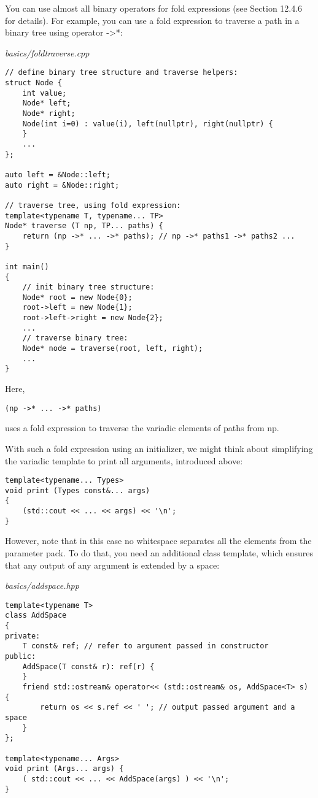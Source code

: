 You can use almost all binary operators for fold expressions (see Section 12.4.6 for details). For example, you can use a fold expression to traverse a path in a binary tree using operator ->*:

\noindent
\textit{basics/foldtraverse.cpp}
\begin{lstlisting}[style=styleCXX]
// define binary tree structure and traverse helpers:
struct Node {
	int value;
	Node* left;
	Node* right;
	Node(int i=0) : value(i), left(nullptr), right(nullptr) {
	}
	...
};

auto left = &Node::left;
auto right = &Node::right;

// traverse tree, using fold expression:
template<typename T, typename... TP>
Node* traverse (T np, TP... paths) {
	return (np ->* ... ->* paths); // np ->* paths1 ->* paths2 ...
}

int main()
{
	// init binary tree structure:
	Node* root = new Node{0};
	root->left = new Node{1};
	root->left->right = new Node{2};
	...
	// traverse binary tree:
	Node* node = traverse(root, left, right);
	...
}
\end{lstlisting}

Here,

\begin{lstlisting}[style=styleCXX]
(np ->* ... ->* paths)
\end{lstlisting}

uses a fold expression to traverse the variadic elements of paths from np.

With such a fold expression using an initializer, we might think about simplifying the variadic template to print all arguments, introduced above:

\begin{lstlisting}[style=styleCXX]
template<typename... Types>
void print (Types const&... args)
{
	(std::cout << ... << args) << '\n';
}
\end{lstlisting}

However, note that in this case no whitespace separates all the elements from the parameter pack. To do that, you need an additional class template, which ensures that any output of any argument is extended by a space:

\noindent
\textit{basics/addspace.hpp}
\begin{lstlisting}[style=styleCXX]
template<typename T>
class AddSpace
{
private:
	T const& ref; // refer to argument passed in constructor
public:
	AddSpace(T const& r): ref(r) {
	}
	friend std::ostream& operator<< (std::ostream& os, AddSpace<T> s) {
		return os << s.ref << ' '; // output passed argument and a space
	}
};

template<typename... Args>
void print (Args... args) {
	( std::cout << ... << AddSpace(args) ) << '\n';
}
\end{lstlisting}


